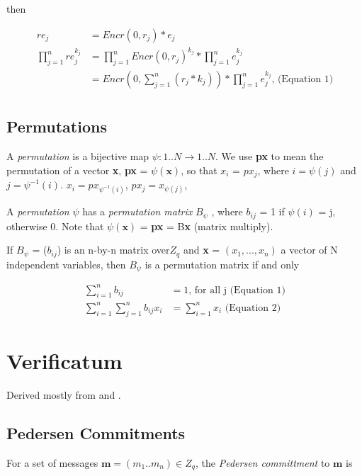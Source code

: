 \documentclass{article}
\begin{document}
then

\begin{align*}
re_{j} & =Encr(0,r_{j})*e_{j}\\
\prod_{j=1}^{n}re_{j}^{k_{j}} & =\prod_{j=1}^{n}Encr(0,r_{j})^{k_{j}}*\prod_{j=1}^{n}e_{j}^{k_{j}}\\
 & =Encr(0,\sum_{j=1}^{n}(r_{j}*k_{j}))*\prod_{j=1}^{n}e_{j}^{k_{j}} \text{,    (Equation\ 1)}\\
\end{align*}

\subsection{Permutations}

A \emph{permutation} is a bijective map $\psi:{1..N}\to{1..N}$. We
use \textbf{px} to mean the permutation of a vector \textbf{x}, \textbf{px}
= $\psi(\textbf{x})$, so that $x_{i}$ = $px_{j}$, where $i={\psi(j)}$
and $j={\psi^{-1}(i)}$. $x_{i}=px_{\psi^{-1}(i)}$, $px_{j}=x_{\psi(j)}$,

A \emph{permutation} $\psi$ has a \emph{permutation matrix} $B_{\psi}$
, where $b_{ij}$ = 1 if $\psi(i)$ = j, otherwise 0. Note that $\psi(\textbf{x})$
= \textbf{px} = B\textbf{x} (matrix multiply).

If $B_{\psi}$ = ($b_{ij}$) is an n-by-n matrix over$Z_{q}$ and
\textbf{x} = $(x_{1},...,x_{n})$ a vector of N independent variables,
then $B_{\psi}$ is a permutation matrix if and only

\begin{align*}
\sum_{i=1}^{n}b_{ij} & =1 \text{, for all j         (Equation 1)}\\
\sum_{i=1}^{n}\sum_{j=1}^{n}b_{ij}x_{i} & =\sum_{i=1}^{n}x_{i}\text{    (Equation 2)}
\end{align*}

\pagebreak
\section{Verificatum}

Derived mostly from \cite{Verificatum} and \cite{Wikstr22}.

\subsection*{Pedersen Commitments}

For a set of messages $\textbf{m}=(m_{1}..m_{n})\in Z_{q}$, the \emph{Pedersen
committment} to $\textbf{m}$ is
\end{document}
